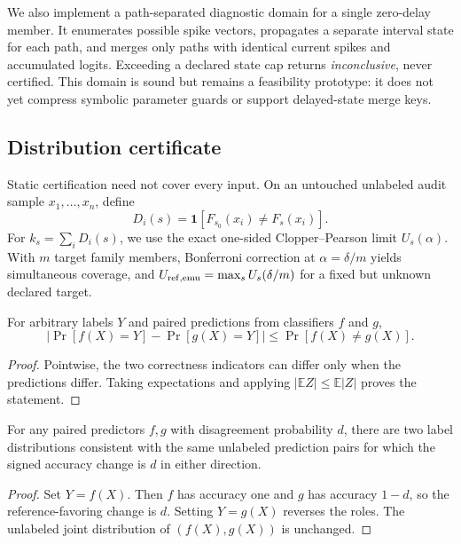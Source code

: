 We also implement a path-separated diagnostic domain for a single zero-delay
member. It enumerates possible spike vectors, propagates a separate interval
state for each path, and merges only paths with identical current spikes and
accumulated logits. Exceeding a declared state cap returns \emph{inconclusive},
never certified. This domain is sound but remains a feasibility prototype: it
does not yet compress symbolic parameter guards or support delayed-state merge
keys.

\subsection{Distribution certificate}

Static certification need not cover every input. On an untouched unlabeled audit
sample $x_1,\ldots,x_n$, define
\begin{equation}
  D_i(s)=\mathbf{1}[F_{s_0}(x_i)\ne F_s(x_i)].
\end{equation}
For $k_s=\sum_i D_i(s)$, we use the exact one-sided Clopper--Pearson limit
$U_s(\alpha)$. With $m$ target family members, Bonferroni correction at
$\alpha=\delta/m$ yields simultaneous coverage, and
$U_{\mathrm{ref},\mathrm{emu}}=\max_s U_s(\delta/m)$ for a fixed but unknown declared target.

\begin{proposition}
For arbitrary labels $Y$ and paired predictions from classifiers $f$ and $g$,
\[
|\Pr[f(X)=Y]-\Pr[g(X)=Y]|\leq \Pr[f(X)\ne g(X)].
\]
\end{proposition}
\begin{proof}
Pointwise, the two correctness indicators can differ only when the predictions
differ. Taking expectations and applying $|\mathbb{E}Z|\leq\mathbb{E}|Z|$
proves the statement.
\end{proof}

\begin{proposition}
For any paired predictors $f,g$ with disagreement probability $d$, there are two
label distributions consistent with the same unlabeled prediction pairs for
which the signed accuracy change is $d$ in either direction.
\end{proposition}
\begin{proof}
Set $Y=f(X)$. Then $f$ has accuracy one and $g$ has accuracy $1-d$, so the
reference-favoring change is $d$. Setting $Y=g(X)$ reverses the roles. The
unlabeled joint distribution of $(f(X),g(X))$ is unchanged.
\end{proof}

